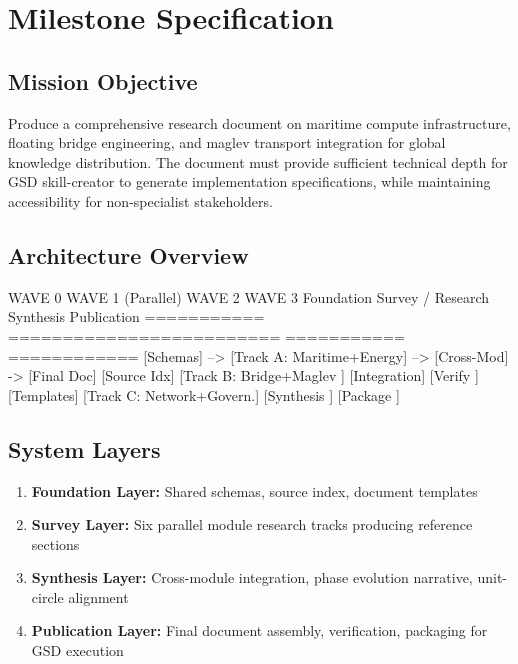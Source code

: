 \documentclass[11pt,letterpaper]{article}
\newcommand{\stageheader}[2]{%
  \noindent\colorbox{#2}{\makebox[\textwidth][l]{%
    \textcolor{white}{\bfseries\sffamily\hspace{6pt}#1\hspace{6pt}}}}%
  \vspace{0.5em}\par%
}
\begin{document}
\newpage

\stageheader{STAGE 3 --- MISSION PACKAGE}{tertiary}

\section{Milestone Specification}

\subsection{Mission Objective}

Produce a comprehensive research document on maritime compute infrastructure, floating bridge engineering, and maglev transport integration for global knowledge distribution. The document must provide sufficient technical depth for GSD skill-creator to generate implementation specifications, while maintaining accessibility for non-specialist stakeholders.

\subsection{Architecture Overview}

\begin{asciibox}
  WAVE 0          WAVE 1 (Parallel)              WAVE 2         WAVE 3
  Foundation      Survey / Research               Synthesis      Publication
  ===========     =========================       ===========    ============
  [Schemas]  -->  [Track A: Maritime+Energy] -->  [Cross-Mod] -> [Final Doc]
  [Source Idx]    [Track B: Bridge+Maglev  ]      [Integration]  [Verify   ]
  [Templates]     [Track C: Network+Govern.]      [Synthesis  ]  [Package  ]
\end{asciibox}

\subsection{System Layers}

\begin{enumerate}[leftmargin=2em]
  \item \textbf{Foundation Layer:} Shared schemas, source index, document templates
  \item \textbf{Survey Layer:} Six parallel module research tracks producing reference sections
  \item \textbf{Synthesis Layer:} Cross-module integration, phase evolution narrative, unit-circle alignment
  \item \textbf{Publication Layer:} Final document assembly, verification, packaging for GSD execution
\end{enumerate}
\end{document}
